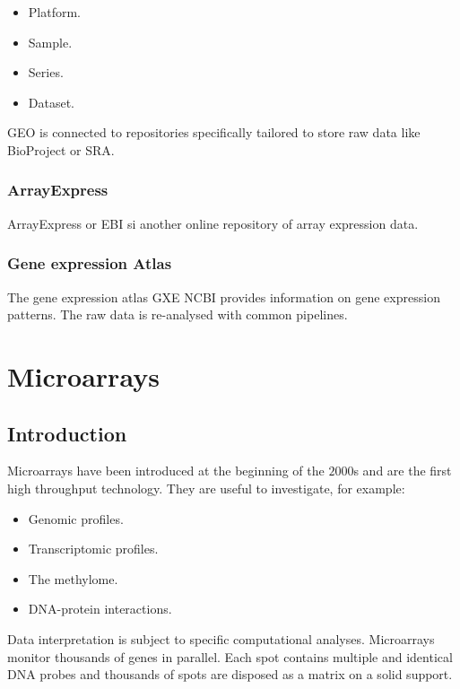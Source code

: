 		\begin{multicols}{4}
			\begin{itemize}
				\item Platform.
				\item Sample.
				\item Series.
				\item Dataset.
			\end{itemize}
		\end{multicols}

		GEO is connected to repositories specifically tailored to store raw data like BioProject or SRA.

		\subsubsection{ArrayExpress}
		ArrayExpress or EBI si another online repository of array expression data.

		\subsubsection{Gene expression Atlas}
		The gene expression atlas GXE NCBI provides information on gene expression patterns.
		The raw data is re-analysed with common pipelines.




\section{Microarrays}

	\subsection{Introduction}
	Microarrays have been introduced at the beginning of the $2000$s and are the first high throughput technology.
	They are useful to investigate, for example:

	\begin{multicols}{2}
		\begin{itemize}
			\item Genomic profiles.
			\item Transcriptomic profiles.
			\item The methylome.
			\item DNA-protein interactions.
		\end{itemize}
	\end{multicols}

	Data interpretation is subject to specific computational analyses.
	Microarrays monitor thousands of genes in parallel.
	Each spot contains multiple and identical DNA probes and thousands of spots are disposed as a matrix on a solid support.

